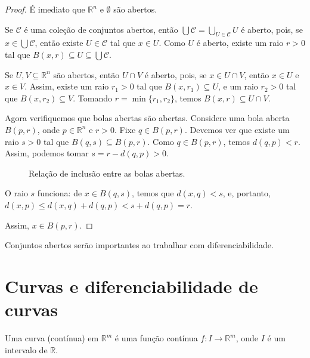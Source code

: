 \begin{proof}
    É imediato que $\mathbb R^n$ e $\emptyset$ são abertos.

    Se $\mathcal C$ é uma coleção de conjuntos abertos, então $\bigcup \mathcal C=\bigcup_{U \in \mathcal C} U$ é aberto, pois, se $x \in \bigcup \mathcal C$, então existe $U \in \mathcal C$ tal que $x \in U$.
    Como $U$ é aberto, existe um raio $r > 0$ tal que $B(x, r) \subseteq U \subseteq \bigcup \mathcal C$.

    Se $U, V\subseteq \mathbb R^n$ são abertos, então $U\cap V$ é aberto, pois, se $x \in U\cap V$, então $x \in U$ e $x \in V$. Assim, existe um raio $r_1 > 0$ tal que $B(x, r_1) \subseteq U$, e um raio $r_2 > 0$ tal que $B(x, r_2) \subseteq V$. Tomando $r = \min\{r_1, r_2\}$, temos $B(x, r) \subseteq U\cap V$.

    Agora verifiquemos que bolas abertas são abertas.
    Considere uma bola aberta $B(p, r)$, onde $p \in \mathbb R^n$ e $r > 0$.
    Fixe $q \in B(p, r)$.
    Devemos ver que existe um raio $s > 0$ tal que $B(q, s) \subseteq B(p, r)$.
    Como $q \in B(p, r)$, temos $d(q, p) < r$.
    Assim, podemos tomar $s = r - d(q, p) > 0$.
    \begin{figure}
    \centering
    \caption{Relação de inclusão entre as bolas abertas.}
    \end{figure}
    O raio $s$ funciona: de $x \in B(q, s)$, temos que $d(x, q) < s$, e, portanto, $d(x, p)\leq d(x, q) + d(q, p) < s + d(q, p) =r$.

    Assim, $x \in B(p, r)$.
\end{proof}

Conjuntos abertos serão importantes ao trabalhar com diferenciabilidade.
\section{Curvas e diferenciabilidade de curvas}
\begin{definition}
Uma curva (contínua) em $\mathbb R^m$ é uma função contínua $f: I\rightarrow \mathbb R^m$, onde $I$ é um intervalo de $\mathbb R$.
\end{definition}

